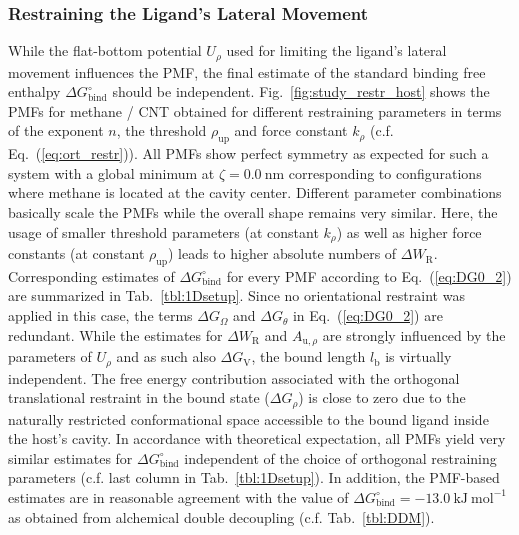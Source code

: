\documentclass[9pt,lessons]{livecoms}
\begin{document}
\subsubsection*{Restraining the Ligand's Lateral Movement}

While the flat-bottom potential $U_\rho$ used for limiting the ligand's lateral movement influences the PMF, the final estimate of the standard binding free enthalpy $\Delta G^\circ_\mathrm{bind}$ should be independent.
Fig.~\ref{fig:study_restr_host} shows the PMFs for methane / CNT obtained for different restraining parameters in terms of the exponent $n$, the threshold $\rho_\mathrm{up}$ and force constant $k_\rho$ 
(c.f. Eq.~(\ref{eq:ort_restr})). 
All PMFs show perfect symmetry as expected for such a system with a global minimum at $\zeta = 0.0~\mathrm{nm}$ corresponding to configurations where methane is located at the cavity center. 
Different parameter combinations basically scale the PMFs while the overall shape remains very similar.
Here, the usage of smaller threshold parameters (at constant $k_\rho$) as well as higher force constants (at constant $\rho_\mathrm{up}$) leads to higher absolute numbers of $\Delta W_\mathrm{R}$.
Corresponding estimates of $\Delta G^\circ_\mathrm{bind}$ for every PMF according to Eq.~(\ref{eq:DG0_2}) are summarized in Tab.~\ref{tbl:1Dsetup}. 
Since no orientational restraint was applied in this case, the terms $\Delta G_\Omega$ and $\Delta G_\theta$ in Eq.~(\ref{eq:DG0_2}) are redundant. 
While the estimates for $\Delta W_\mathrm{R}$ and $A_{\mathrm{u},\rho}$ are strongly influenced by the parameters of $U_\rho$ and as such also $\Delta G_\mathrm{V}$, 
the bound length $l_\mathrm{b}$ is virtually independent.
The free energy contribution associated with the orthogonal translational restraint in the bound state ($\Delta G_\rho$) is close to zero due to the naturally restricted conformational space accessible to the bound ligand inside the host's cavity. 
In accordance with theoretical expectation, all PMFs yield very similar estimates for $\Delta G^\circ_\mathrm{bind}$ independent of the choice of orthogonal restraining parameters (c.f. last column in Tab.~\ref{tbl:1Dsetup}).
%
In addition, the PMF-based estimates are in reasonable agreement with the value of $\Delta G^\circ_\mathrm{bind} = -13.0~\mathrm{kJ}~\mathrm{mol}^{-1}$ as obtained from alchemical double decoupling 
(c.f. Tab.~\ref{tbl:DDM}).
\end{document}
